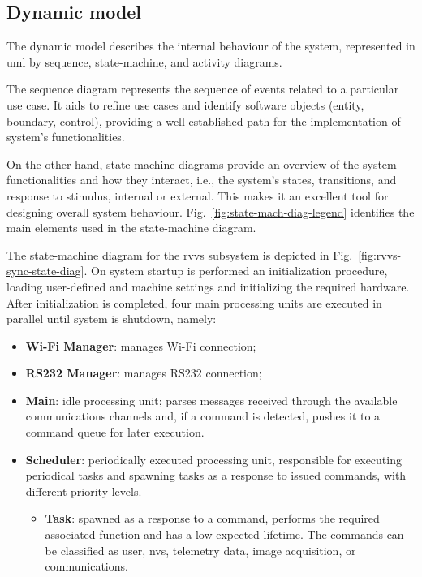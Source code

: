 \subsection{Dynamic model}%
\label{sec:dynamic-model-rvvs}
The dynamic model describes the internal behaviour of the system, represented in
\gls{uml} by sequence, state-machine, and activity diagrams.

The sequence
diagram represents the sequence of events related to a particular use
case. It aids to refine use cases and identify software objects (entity,
boundary, control), providing a well-established path for the implementation of
system's functionalities.

On the other hand, state-machine diagrams provide an overview of the system
functionalities and how they interact, i.e., the system's states, transitions,
and response to stimulus, internal or external. This makes it an excellent tool
for designing overall system behaviour. Fig.~\ref{fig:state-mach-diag-legend}
identifies the main elements used in the state-machine diagram.

The state-machine diagram for the \gls{rvvs} subsystem is depicted in
Fig.~\ref{fig:rvvs-sync-state-diag}. On system startup is performed an
initialization procedure, loading user-defined and machine settings and
initializing the required hardware. After initialization is completed, four main
processing units are executed in parallel until system is shutdown, namely:
\begin{itemize}
\item \textbf{Wi-Fi Manager}: manages Wi-Fi connection;
\item \textbf{RS232 Manager}: manages RS232 connection;
\item \textbf{Main}: idle processing unit; parses messages received through the
  available communications channels and, if a
  command is detected, pushes it to a command queue for later execution.
\item \textbf{Scheduler}: periodically executed processing unit, responsible for
  executing periodical tasks and spawning tasks as a response to issued
  commands, with different priority levels.
  \begin{itemize}
  \item \textbf{Task}: spawned as a response to a command, performs the
    required associated function and has a low expected lifetime. The commands
    can be classified as user, \gls{nvs}, telemetry data, image acquisition, or
    communications.
  \end{itemize}
\end{itemize}

